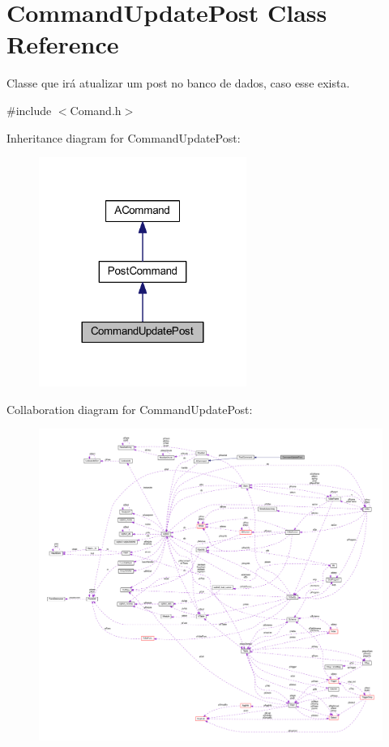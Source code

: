\hypertarget{class_command_update_post}{\section{Command\-Update\-Post Class Reference}
\label{class_command_update_post}
}


Classe que irá atualizar um post no banco de dados, caso esse exista.  




{\ttfamily \#include $<$Comand.\-h$>$}



Inheritance diagram for Command\-Update\-Post\-:\nopagebreak
\begin{figure}[H]
\begin{center}
\leavevmode
\includegraphics[width=192pt]{class_command_update_post__inherit__graph}
\end{center}
\end{figure}


Collaboration diagram for Command\-Update\-Post\-:\nopagebreak
\begin{figure}[H]
\begin{center}
\leavevmode
\includegraphics[width=350pt]{class_command_update_post__coll__graph}
\end{center}
\end{figure}
